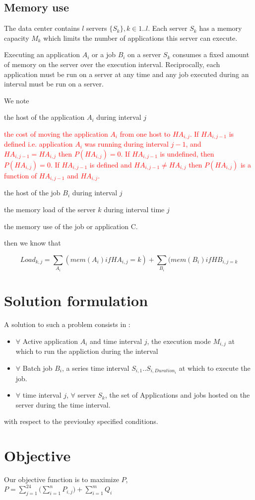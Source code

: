 \documentclass[a4paper]{article}
\newcommand\gilles[1]{\textcolor{red}{#1}}
\begin{document}
\subsection{Memory use}

The data center contains $l$ servers $\{S_k\}, k\in 1..l$. Each server $S_k$ has a memory capacity $M_k$ which limits the number of applications this server can execute.

Executing an application $A_i$ or a job $B_i$ on a server $S_k$ consumes a fixed amount of memory 
on the server over the execution interval. Reciprocally, each application must be run on a server at any time and any job executed during an interval must be run on a server.

We note
\begin{description}
\item[$HA_{i,j}$] the host of the application $A_i$ during interval $j$
\gilles{
\item[$P(HA_{i,j})$] the cost of moving the application $A_i$ from one host to $HA_{i,j}$. If $HA_{i,j-1}$ is defined i.e. application $A_i$ was running during interval $j-1$, and $HA_{i,j-1} = HA_{i,j}$ then $P(HA_{i,j}) = 0$. If $HA_{i,j-1}$ is undefined, then $P(HA_{i,j}) = 0$. If $HA_{i,j-1}$ is defined and $HA_{i,j-1} \neq HA_{i,j}$ then $P(HA_{i,j})$ is a function of $HA_{i,j-1}$ and $HA_{i,j}$. }
\item[$HB_{i,j}$] the host of the job $B_i$ during interval $j$
\item[$Load_{k,j}$] the memory load of the server $k$ during interval time $j$
\item[$mem(C)$] the memory use of the job or application C.
\end{description}

then we know that

\begin{equation}
Load_{k,j} = \sum_{A_i}(mem(A_i) if HA_{i,j}=k) + \sum_{B_i}(mem(B_i) if HB_{i,j=k}
\end{equation}

\section{Solution formulation}

A solution to such a problem consists in :
\begin{itemize}
\item $\forall$ Active application $A_i$ and time interval $j$, the execution mode $M_{i,j}$ at which to run the appliction during the interval
\item $\forall$ Batch job $B_i$, a series time interval $S_{i,1}..S_{i, Duration_i}$ at which to execute the job.
\item $\forall$ time interval $j$, $\forall$ server $S_k $, the set of Applications and jobs hosted on the server during the time interval.
\end{itemize}
with respect to the previoulsy specified conditions.

\section{Objective}
Our objective function is to maximize $P$,\\
$P= \sum_{j=1}^{24} \bigg( \sum_{i=1}^{n} {P_{i,j}}\bigg)  + \sum_{i=1}^{m} Q_i$

\end{document}

